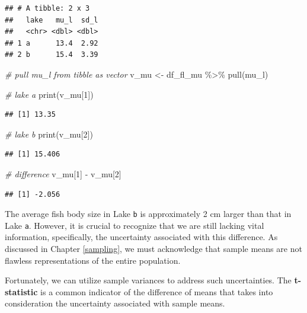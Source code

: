 \documentclass[
]{article}
\newenvironment{Shaded}{\begin{snugshade}}{\end{snugshade}}
\newcommand{\CommentTok}[1]{\textcolor[rgb]{0.56,0.35,0.01}{\textit{#1}}}
\newcommand{\DecValTok}[1]{\textcolor[rgb]{0.00,0.00,0.81}{#1}}
\newcommand{\FunctionTok}[1]{\textcolor[rgb]{0.00,0.00,0.00}{#1}}
\newcommand{\NormalTok}[1]{#1}
\newcommand{\OtherTok}[1]{\textcolor[rgb]{0.56,0.35,0.01}{#1}}
\newcommand{\SpecialCharTok}[1]{\textcolor[rgb]{0.00,0.00,0.00}{#1}}
\begin{document}
\begin{verbatim}
## # A tibble: 2 x 3
##   lake   mu_l  sd_l
##   <chr> <dbl> <dbl>
## 1 a      13.4  2.92
## 2 b      15.4  3.39
\end{verbatim}

\begin{Shaded}
\begin{Highlighting}[]
\CommentTok{\# pull mu\_l from tibble as vector}
\NormalTok{v\_mu }\OtherTok{\textless{}{-}}\NormalTok{ df\_fl\_mu }\SpecialCharTok{\%\textgreater{}\%} 
  \FunctionTok{pull}\NormalTok{(mu\_l)}

\CommentTok{\# lake a}
\FunctionTok{print}\NormalTok{(v\_mu[}\DecValTok{1}\NormalTok{])}
\end{Highlighting}
\end{Shaded}

\begin{verbatim}
## [1] 13.35
\end{verbatim}

\begin{Shaded}
\begin{Highlighting}[]
\CommentTok{\# lake b}
\FunctionTok{print}\NormalTok{(v\_mu[}\DecValTok{2}\NormalTok{])}
\end{Highlighting}
\end{Shaded}

\begin{verbatim}
## [1] 15.406
\end{verbatim}

\begin{Shaded}
\begin{Highlighting}[]
\CommentTok{\# difference}
\NormalTok{v\_mu[}\DecValTok{1}\NormalTok{] }\SpecialCharTok{{-}}\NormalTok{ v\_mu[}\DecValTok{2}\NormalTok{]}
\end{Highlighting}
\end{Shaded}

\begin{verbatim}
## [1] -2.056
\end{verbatim}

The average fish body size in Lake \texttt{b} is approximately 2 cm larger than that in Lake \texttt{a}. However, it is crucial to recognize that we are still lacking vital information, specifically, the uncertainty associated with this difference. As discussed in Chapter \ref{sampling}, we must acknowledge that sample means are not flawless representations of the entire population.

Fortunately, we can utilize sample variances to address such uncertainties. The \textbf{t-statistic} is a common indicator of the difference of means that takes into consideration the uncertainty associated with sample means.
\end{document}
